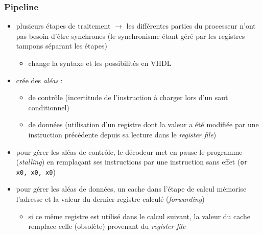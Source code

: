 \documentclass{beamer}
\begin{document}
\begin{frame}
\frametitle{Pipeline}
\begin{itemize}
\item plusieurs étapes de traitement $\rightarrow$ les différentes parties du
    processeur n'ont pas besoin d'être synchrones (le synchronisme étant géré
    par les registres tampons séparant les étapes)
    \begin{itemize}
    \item change la syntaxe et les possibilités en VHDL
    \end{itemize}
\item crée des \textit{aléas} :
    \begin{itemize}
    \item de contrôle (incertitude de l'instruction à charger lors d'un saut
        conditionnel)
    \item de données (utilisation d'un registre dont la valeur a été modifiée
        par une instruction précédente depuis sa lecture dans le
        \textit{register file})
    \end{itemize}
\item pour gérer les aléas de contrôle, le décodeur met en pause le programme
    (\textit{stalling}) en remplaçant ses instructions par une instruction sans
    effet (\texttt{or x0, x0, x0})
\item pour gérer les aléas de données, un cache dans l'étape de calcul mémorise
    l'adresse et la valeur du dernier registre calculé (\textit{forwarding})
    \begin{itemize}
    \item si ce même registre est utilisé dans le calcul suivant, la valeur du
        cache remplace celle (obsolète) provenant du \textit{register file}
    \end{itemize}
\end{itemize}
\end{frame}
\end{document}
